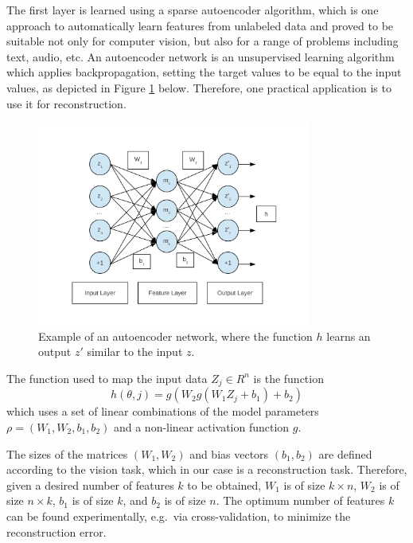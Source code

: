 \documentclass[runningheads]{llncs}
\begin{document}
The first layer is learned using a sparse autoencoder algorithm, which is one approach to automatically learn features from unlabeled data and proved to be suitable not only for computer vision, but also for a range of problems including text, audio, etc. An autoencoder network is an unsupervised learning algorithm which applies backpropagation, setting the target values to be equal to the input values, as depicted in Figure \ref{fig:autoencoder} below. Therefore, one practical application is to use it for reconstruction. 

\begin{figure}
\begin{center}
\includegraphics[width = 0.8\textwidth]{autoencoder}
\end{center}
\caption{Example of an autoencoder network, where the function $h$ learns an output $z'$ similar to the input $z$.}
\label{fig:autoencoder}
\end{figure}

The function used to map the input data $Z_j\in R^n$ is the function
\begin{equation}
 h(\theta,j)= g(W_2 g(W_1 Z_j+b_1)+b_2)
\end{equation}
which uses a set of linear combinations of the model parameters 
$\rho=(W_1,W_2,b_1,b_2)$ and a non-linear activation function $g$.

The sizes of the matrices $(W_1,W_2)$ and bias vectors $(b_1,b_2)$ are defined according to the vision task, which in our case is a reconstruction task. Therefore, given a desired number of features $k$ to be obtained, $W_1$ is of size $k\times n$, $W_2$ is of size $n\times k$, $b_1$ is of size $k$, and $b_2$ is of size $n$. The optimum number of features $k$ can be found experimentally, e.g.\ via cross-validation, to minimize the reconstruction error.
\end{document}
